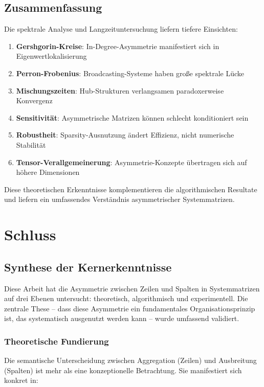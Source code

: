 \documentclass[a4paper,12pt]{report}
\theoremstyle{definition}
\begin{document}
	\section{Zusammenfassung}
	
	Die spektrale Analyse und Langzeituntersuchung liefern tiefere Einsichten:
	
	\begin{enumerate}
		\item \textbf{Gershgorin-Kreise}: In-Degree-Asymmetrie manifestiert sich in Eigenwertlokalisierung
		\item \textbf{Perron-Frobenius}: Broadcasting-Systeme haben große spektrale Lücke
		\item \textbf{Mischungszeiten}: Hub-Strukturen verlangsamen paradoxerweise Konvergenz
		\item \textbf{Sensitivität}: Asymmetrische Matrizen können schlecht konditioniert sein
		\item \textbf{Robustheit}: Sparsity-Ausnutzung ändert Effizienz, nicht numerische Stabilität
		\item \textbf{Tensor-Verallgemeinerung}: Asymmetrie-Konzepte übertragen sich auf höhere Dimensionen
	\end{enumerate}
	
	Diese theoretischen Erkenntnisse komplementieren die algorithmischen Resultate und liefern ein umfassendes Verständnis asymmetrischer Systemmatrizen.
	
	\chapter{Schluss}
	
	\section{Synthese der Kernerkenntnisse}
	
	Diese Arbeit hat die Asymmetrie zwischen Zeilen und Spalten in Systemmatrizen auf drei Ebenen untersucht: theoretisch, algorithmisch und experimentell. Die zentrale These – dass diese Asymmetrie ein fundamentales Organisationsprinzip ist, das systematisch ausgenutzt werden kann – wurde umfassend validiert.
	
	\subsection{Theoretische Fundierung}
	
	Die semantische Unterscheidung zwischen Aggregation (Zeilen) und Ausbreitung (Spalten) ist mehr als eine konzeptionelle Betrachtung. Sie manifestiert sich konkret in:
	
\end{document}
